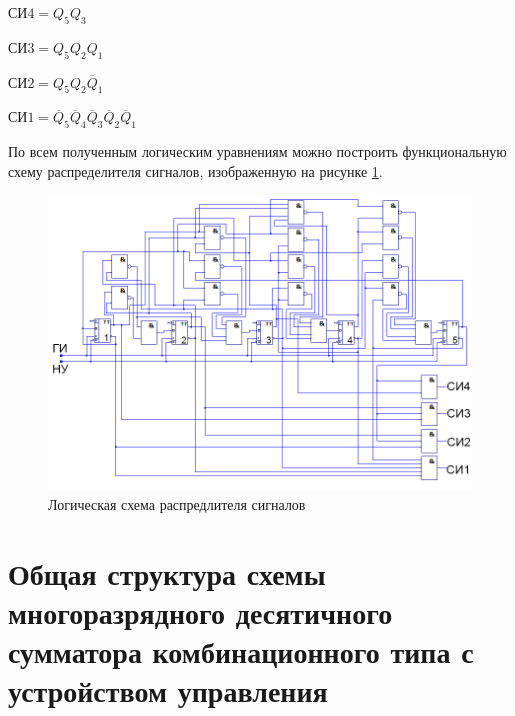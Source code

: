 \documentclass[a4paper,14pt]{article}
\begin{document}
$\text{СИ}4 = Q_5Q_3$

$\text{СИ}3 = Q_5Q_2Q_1$

$\text{СИ}2 = Q_5Q_2\overline{Q}_1$

$\text{СИ}1 = \overline{Q}_5\overline{Q}_4\overline{Q}_3\overline{Q}_2\overline{Q}_1$

По всем полученным логическим уравнениям можно построить функциональную схему распределителя сигналов, изображенную на рисунке \ref{fig:gen_ch_sh}.
\begin{landscape}
\begin{figure}[H]
	\centering
	\includegraphics[width=0.8\linewidth]{images/gen_ch_sh}
	\caption{Логическая схема распредлителя сигналов}
	\label{fig:gen_ch_sh}
\end{figure}
\end{landscape}

\section{Общая структура схемы многоразрядного десятичного сумматора комбинационного типа с устройством управления}
\end{document}
